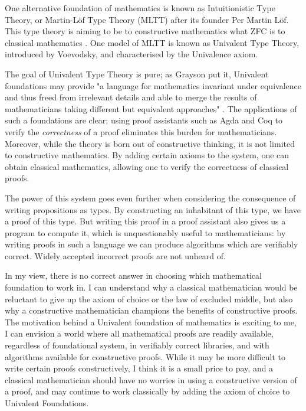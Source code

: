 \documentclass[ProjectReport]{subfiles}
\begin{document}
One alternative foundation of mathematics is known as Intuitionistic Type Theory, or Martin-L\"{o}f Type Theory (MLTT) after its founder Per Martin L\"{o}f. This type theory is aiming to be to constructive mathematics what ZFC is to classical mathematics \cite{dybjer_intuitionistic_2020}. One model of MLTT is known as Univalent Type Theory, introduced by Voevodsky, and characterised by the Univalence axiom. 

The goal of Univalent Type Theory is pure; as Grayson put it, Univalent foundations may provide "a language for mathematics invariant under equivalence and thus freed from irrelevant details and able to merge the results of mathematicians taking different but equivalent approaches" \cite{grayson_introduction_2018}. The applications of such a foundations are clear; using proof assistants such as Agda and Coq to verify the \textit{correctness} of a proof eliminates this burden for mathematicians. Moreover, while the theory is born out of constructive thinking, it is not limited to constructive mathematics. By adding certain axioms to the system, one can obtain classical mathematics, allowing one to verify the correctness of classical proofs. 

The power of this system goes even further when considering the consequence of writing propositions as types. By constructing an inhabitant of this type, we have a proof of this type. But writing this proof in a proof assistant also gives us a program to compute it, which is unquestionably useful to mathematicians: by writing proofs in such a language we can produce algorithms which are verifiably correct. Widely accepted incorrect proofs \cite{Incorrect_Proofs} are not unheard of.

In my view, there is no correct answer in choosing which mathematical foundation to work in. I can understand why a classical mathematician would be reluctant to give up the axiom of choice or the law of excluded middle, but also why a constructive mathematician champions the benefits of constructive proofs. The motivation behind a Univalent foundation of mathematics is exciting to me, I can envision a world where all mathematical proofs are readily available, regardless of foundational system, in verifiably correct libraries, and with algorithms available for constructive proofs. While it may be more difficult to write certain proofs constructively, I think it is a small price to pay, and a classical mathematician should have no worries in using a constructive version of a proof, and may continue to work classically by adding the axiom of choice to Univalent Foundations.
\end{document}
